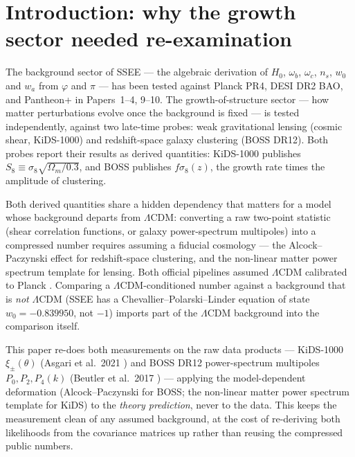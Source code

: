 \documentclass[12pt,a4paper]{article}
\newcommand{\SSEE}{\textsc{SSEE}}
\begin{document}
\section{Introduction: why the growth sector needed re-examination}

The background sector of \SSEE{} --- the algebraic derivation of $H_0$,
$\omega_b$, $\omega_c$, $n_s$, $w_0$ and $w_a$ from $\varphi$ and $\pi$ --- has
been tested against Planck PR4, DESI DR2 BAO, and Pantheon+ in Papers~1--4,
9--10. The growth-of-structure sector --- how matter perturbations evolve once
the background is fixed --- is tested independently, against two late-time
probes: weak gravitational lensing (cosmic shear, KiDS-1000) and redshift-space
galaxy clustering (BOSS DR12). Both probes report their results as derived
quantities: KiDS-1000 publishes $S_8\equiv\sigma_8\sqrt{\Omega_m/0.3}$, and BOSS
publishes $f\sigma_8(z)$, the growth rate times the amplitude of clustering.

Both derived quantities share a hidden dependency that matters for a model
whose background departs from $\Lambda$CDM: converting a raw two-point
statistic (shear correlation functions, or galaxy power-spectrum multipoles)
into a compressed number requires assuming a fiducial cosmology --- the
Alcock--Paczynski effect \citep{AlcockPaczynski1979} for redshift-space
clustering, and the non-linear matter power spectrum template for lensing.
Both official pipelines assumed $\Lambda$CDM calibrated to Planck
\citep{Planck2020}. Comparing a $\Lambda$CDM-conditioned number against a
background that is \emph{not} $\Lambda$CDM (\SSEE{} has a
Chevallier--Polarski--Linder \citep{ChevallierPolarski2001,Linder2003}
equation of state $w_0=-0.839950$, not $-1$) imports part of the $\Lambda$CDM
background into the comparison itself.

This paper re-does both measurements on the raw data products --- KiDS-1000
$\xi_\pm(\theta)$ (Asgari et al.~2021 \citep{Asgari2021}) and BOSS DR12 power-spectrum multipoles
$P_0,P_2,P_4(k)$ (Beutler et al.~2017 \citep{Beutler2017}) --- applying the model-dependent
deformation (Alcock--Paczynski for BOSS; the non-linear matter power spectrum
template for KiDS) to the \emph{theory prediction}, never to the data. This
keeps the measurement clean of any assumed background, at the cost of
re-deriving both likelihoods from the covariance matrices up rather than
reusing the compressed public numbers.
\end{document}
